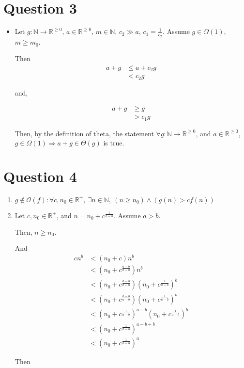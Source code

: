 \documentclass[12pt]{article}
\begin{document}
\section*{Question 3}
\begin{itemize}
    \item

    Let $g: \mathbb{N} \to \mathbb{R}^{\geq 0}$, $a \in \mathbb{R}^{\geq 0}$,
    $m \in \mathbb{N}$, $c_2 \gg a$, $c_1 = \frac{1}{c_2}$. Assume $g \in \Omega (1)$,
    $m \geq m_0$.

    \bigskip

    Then
    \setcounter{equation}{0}
    \begin{align}
        a + g &\leq a + c_2 g\\
        &< c_2 g
    \end{align}

    and,

    \begin{align}
        a + g &\geq g\\
        &> c_1 g
    \end{align}

    \bigskip

    Then, by the definition of theta, the statement $\forall g: \mathbb{N} \to
    \mathbb{R}^{\geq 0}$, and $a \in \mathbb{R}^{\geq 0}$, $g \in \Omega(1)
    \Rightarrow a + g \in \Theta(g)$ is true.

\end{itemize}

\section*{Question 4}
\begin{enumerate}
    \item

    $g \notin \mathcal{O}(f): \forall c,n_0 \in \mathbb{R}^{+},\:\exists n \in \mathbb{N},\:(
    n \geq n_0) \land (g(n) > cf(n))$

    \item

    Let $c,n_0 \in \mathbb{R}^{+}$, and $n = n_0 + c^{\frac{1}{a-b}}$. Assume $a > b$.

    \bigskip

    Then, $n \geq n_0$.

    \bigskip

    And
    \setcounter{equation}{0}
    \begin{align}
        cn^b &< (n_0 + c)n^b\\
        &< (n_0 + c^{\frac{a-b}{a-b}})n^b\\
        &< (n_0 + c^{\frac{a-b}{a-b}})(n_0 + c^{\frac{1}{a-b}})^b\\
        &< (n_0 + c^{\frac{a-b}{a-b}})(n_0 + c^{\frac{1}{a-b}})^b\\
        &< (n_0 + c^{\frac{1}{a-b}})^{a-b}(n_0 + c^{\frac{1}{a-b}})^b\\
        &< (n_0 + c^{\frac{1}{a-b}})^{a-b+b}\\
        &< (n_0 + c^{\frac{1}{a-b}})^a
    \end{align}

    Then

\end{enumerate}
\end{document}
